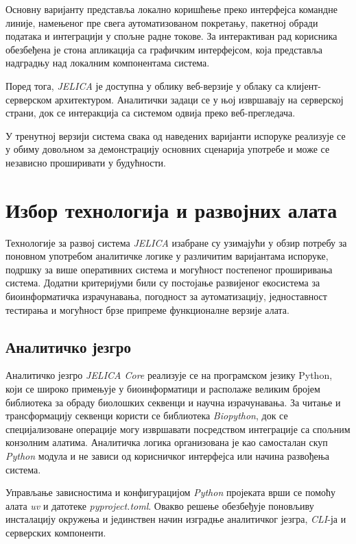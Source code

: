 \documentclass[12pt,oneside]{memoir}
\begin{document}
Основну варијанту представља локално коришћење преко интерфејса командне линије, намењеног пре свега аутоматизованом покретању, пакетној обради података и интеграцији у спољне радне токове. За интерактиван рад корисника обезбеђена је стона апликација са графичким интерфејсом, која представља надградњу над локалним компонентама система.

Поред тога, \textit{JELICA} је доступна у облику веб-верзије у облаку са клијент-серверском архитектуром. Аналитички задаци се у њој извршавају на серверској страни, док се интеракција са системом одвија преко веб-прегледача.

У тренутној верзији система свака од наведених варијанти испоруке реализује се у обиму довољном за демонстрацију основних сценарија употребе и може се независно проширивати у будућности.


\section{Избор технологија и развојних алата}
Технологије за развој система \textit{JELICA} изабране су узимајући у обзир потребу за поновном употребом аналитичке логике у различитим варијантама испоруке, подршку за више оперативних система и могућност постепеног проширивања система. Додатни критеријуми били су постојање развијеног екосистема за биоинформатичка израчунавања, погодност за аутоматизацију, једноставност тестирања и могућност брзе припреме функционалне верзије алата.


\subsection{Аналитичко језгро}
Аналитичко језгро \textit{JELICA Core} реализује се на програмском језику Python, који се широко примењује у биоинформатици и располаже великим бројем библиотека за обраду биолошких секвенци и научна израчунавања. За читање и трансформацију секвенци користи се библиотека \textit{Biopython}, док се специјализоване операције могу извршавати посредством интеграције са спољним конзолним алатима. Аналитичка логика организована је као самосталан скуп \textit{Python} модула и не зависи од корисничког интерфејса или начина развођења система.

Управљање зависностима и конфигурацијом \textit{Python} пројеката врши се помоћу алата \textit{uv} и датотеке \textit{pyproject.toml}. Овакво решење обезбеђује поновљиву инсталацију окружења и јединствен начин изградње аналитичког језгра, \textit{CLI}-ја и серверских компоненти.
\end{document}
